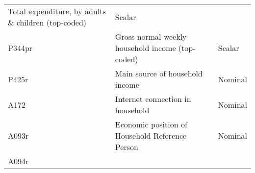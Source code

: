 \documentclass[]{article}
\begin{document}
\begin{longtable}[]{@{}lll@{}}
\begin{minipage}[t]{0.64\columnwidth}
Total expenditure, by adults \& children (top-coded)\strut
\end{minipage} & \begin{minipage}[t]{0.14\columnwidth}\raggedright
Scalar\strut
\end{minipage}\tabularnewline
\begin{minipage}[t]{0.14\columnwidth}\raggedright
P344pr\strut
\end{minipage} & \begin{minipage}[t]{0.64\columnwidth}\raggedright
Gross normal weekly household income (top-coded)\strut
\end{minipage} & \begin{minipage}[t]{0.14\columnwidth}\raggedright
Scalar\strut
\end{minipage}\tabularnewline
\begin{minipage}[t]{0.14\columnwidth}\raggedright
P425r\strut
\end{minipage} & \begin{minipage}[t]{0.64\columnwidth}\raggedright
Main source of household income\strut
\end{minipage} & \begin{minipage}[t]{0.14\columnwidth}\raggedright
Nominal\strut
\end{minipage}\tabularnewline
\begin{minipage}[t]{0.14\columnwidth}\raggedright
A172\strut
\end{minipage} & \begin{minipage}[t]{0.64\columnwidth}\raggedright
Internet connection in household\strut
\end{minipage} & \begin{minipage}[t]{0.14\columnwidth}\raggedright
Nominal\strut
\end{minipage}\tabularnewline
\begin{minipage}[t]{0.14\columnwidth}\raggedright
A093r\strut
\end{minipage} & \begin{minipage}[t]{0.64\columnwidth}\raggedright
Economic position of Household Reference Person\strut
\end{minipage} & \begin{minipage}[t]{0.14\columnwidth}\raggedright
Nominal\strut
\end{minipage}\tabularnewline
\begin{minipage}[t]{0.14\columnwidth}\raggedright
A094r\strut
\end{minipage} & \begin{minipage}[t]{0.64\columnwidth}\raggedright

\end{minipage}
\end{longtable}
\end{document}
